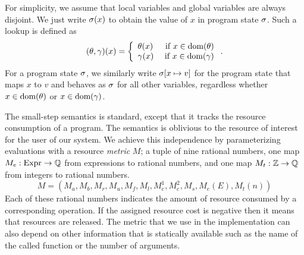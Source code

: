 \documentclass[nocopyrightspace,preprint]{sigplanconf}
\begin{document}
For simplicity, we assume that local variables and global variables
are always disjoint.  We just write $\sigma(x)$ to obtain the value of
$x$ in program state $\sigma$.  Such a lookup is defined as
$$
(\theta, \gamma)(x) =
\left\{
\begin{array}{lr}
\theta(x) & \mbox{ if } x \in  \text{dom}(\theta) \\
\gamma(x) & \mbox{ if } x \in  \text{dom}(\gamma)
\end{array}
\right..
$$
For a program state $\sigma$, we similarly write $\sigma[x \mapsto v]$
for the program state that maps $x$ to $v$ and behaves as $\sigma$ for
all other variables, regardless whether $x \in  \text{dom}(\theta)$ or $x \in
 \text{dom}(\gamma)$.

The small-step semantics is standard, except that it tracks the
resource consumption of a program.  The semantics is oblivious to the
resource of interest for the user of our system.  We achieve this
independence by parameterizing evaluations with a resource
\emph{metric} $M$; a tuple of nine rational numbers, one map $M_e :
\text{Expr} \to \mathbb{Q}$ from expressions to rational numbers, and one map
$M_t : \mathbb{Z} \to \mathbb{Q}$ from integers to rational numbers.
$$
M = (
M_a,
M_b,
M_r,
M_u,
M_f,
M_l,
M_c^1,
M_c^2,
M_s,
M_e(E),
M_t(n)
)
$$
Each of these rational numbers indicates the amount of resource
consumed by a corresponding operation.  If the assigned resource cost
is negative then it means that resources are released.  The metric
that we use in the implementation can also depend on other information
that is statically available such as the name of the called function
or the number of arguments.
\end{document}
